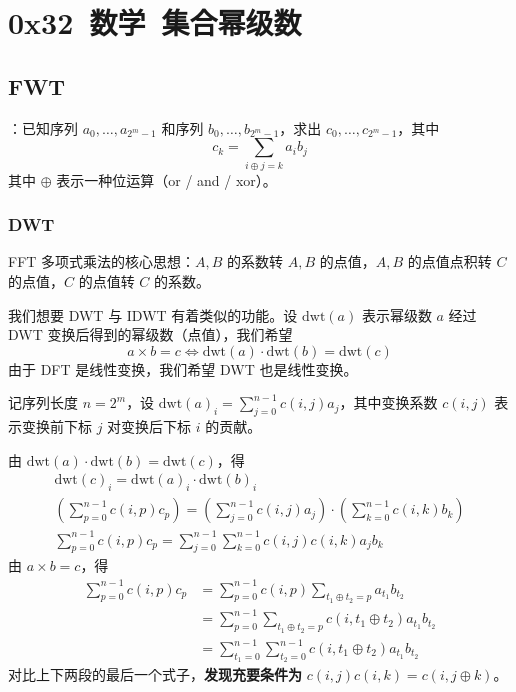 \section{0x32\ 数学\ 集合幂级数}
\label{sec:0x32}

\subsection{FWT}

：已知序列 $a_0, \dots, a_{2^m - 1}$ 和序列 $b_0, \dots, b_{2^m - 1}$，求出 $c_0, \dots, c_{2^m - 1}$，其中
\[
c_k = \sum_{i \oplus j = k} a_ib_j
\]
其中 $\oplus$ 表示一种位运算（or / and / xor）。

\subsubsection{DWT}

\begin{quoteblock}
FFT 多项式乘法的核心思想：$A, B$ 的系数转 $A, B$ 的点值，$A, B$ 的点值点积转 $C$ 的点值，$C$ 的点值转 $C$ 的系数。
\end{quoteblock}

我们想要 DWT 与 IDWT 有着类似的功能。设 $\mathrm{dwt}(a)$ 表示幂级数 $a$ 经过 DWT 变换后得到的幂级数（点值），我们希望
\[
a \times b = c \iff \mathrm{dwt}(a) \cdot \mathrm{dwt}(b) = \mathrm{dwt}(c)
\]
由于 DFT 是线性变换，我们希望 DWT 也是线性变换。

记序列长度 $n = 2^m$，设 $\mathrm{dwt}(a)_i = \sum_{j = 0}^{n - 1} c(i, j)a_j$，其中变换系数 $c(i, j)$ 表示变换前下标 $j$ 对变换后下标 $i$ 的贡献。

由 $\mathrm{dwt}(a) \cdot \mathrm{dwt}(b) = \mathrm{dwt}(c)$，得
\[
\begin{gathered}
\mathrm{dwt}(c)_i = \mathrm{dwt}(a)_i \cdot \mathrm{dwt}(b)_i \\
\left( \sum_{p = 0}^{n - 1}c(i, p)c_p \right) = \left( \sum_{j = 0}^{n - 1}c(i, j)a_j \right) \cdot \left( \sum_{k = 0}^{n - 1}c(i, k)b_k \right) \\
\sum_{p = 0}^{n - 1}c(i, p)c_p = \sum_{j = 0}^{n - 1}\sum_{k = 0}^{n - 1}c(i, j)c(i, k)a_jb_k
\end{gathered}
\]
由 $a \times b = c$，得
\[
\begin{aligned}
\sum_{p = 0}^{n - 1} c(i, p)c_p & = \sum_{p = 0}^{n - 1} c(i, p) \sum_{t_1 \oplus t_2 = p} a_{t_1}b_{t_2} \\
& = \sum_{p = 0}^{n - 1} \sum_{t_1 \oplus t_2 = p} c(i, t_1 \oplus t_2) a_{t_1}b_{t_2} \\
& = \sum_{t_1 = 0}^{n - 1} \sum_{t_2 = 0}^{n - 1} c(i, t_1 \oplus t_2) a_{t_1}b_{t_2}
\end{aligned}
\]
对比上下两段的最后一个式子，\textbf{发现充要条件为} $c(i, j)c(i, k) = c(i, j \oplus k)$。

